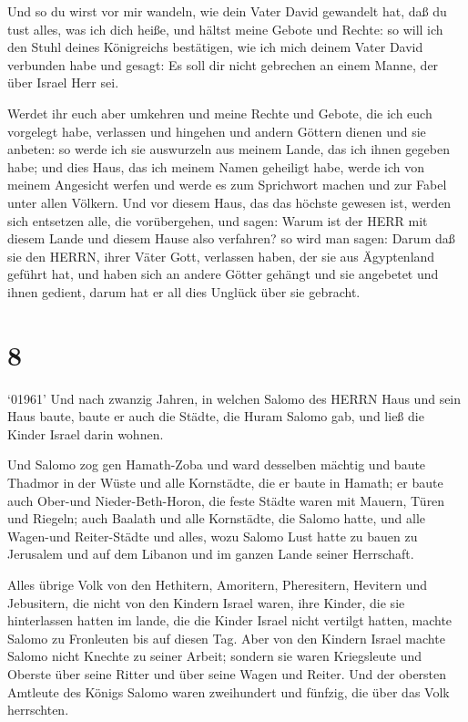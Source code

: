  Und so du wirst vor mir wandeln, wie dein Vater David
gewandelt hat, daß du tust alles, was ich dich heiße, und hältst meine
Gebote und Rechte:  so will ich den Stuhl deines
Königreichs bestätigen, wie ich mich deinem Vater David verbunden habe
und gesagt: Es soll dir nicht gebrechen an einem Manne, der über Israel
Herr sei.

 Werdet ihr euch aber umkehren und meine Rechte und Gebote,
die ich euch vorgelegt habe, verlassen und hingehen und andern Göttern
dienen und sie anbeten:  so werde ich sie auswurzeln aus
meinem Lande, das ich ihnen gegeben habe; und dies Haus, das ich meinem
Namen geheiligt habe, werde ich von meinem Angesicht werfen und werde es
zum Sprichwort machen und zur Fabel unter allen Völkern. 
Und vor diesem Haus, das das höchste gewesen ist, werden sich entsetzen
alle, die vorübergehen, und sagen: Warum ist der HERR mit diesem Lande
und diesem Hause also verfahren?  so wird man sagen: Darum
daß sie den HERRN, ihrer Väter Gott, verlassen haben, der sie aus
Ägyptenland geführt hat, und haben sich an andere Götter gehängt und sie
angebetet und ihnen gedient, darum hat er all dies Unglück über sie
gebracht.

\hypertarget{section-7}{%
\section{8}\label{section-7}}

 `01961' Und nach zwanzig Jahren, in welchen Salomo des
HERRN Haus und sein Haus baute,  baute er auch die Städte,
die Huram Salomo gab, und ließ die Kinder Israel darin wohnen.

 Und Salomo zog gen Hamath-Zoba und ward desselben mächtig
 und baute Thadmor in der Wüste und alle Kornstädte, die er
baute in Hamath;  er baute auch Ober-und Nieder-Beth-Horon,
die feste Städte waren mit Mauern, Türen und Riegeln;  auch
Baalath und alle Kornstädte, die Salomo hatte, und alle Wagen-und
Reiter-Städte und alles, wozu Salomo Lust hatte zu bauen zu Jerusalem
und auf dem Libanon und im ganzen Lande seiner Herrschaft.

 Alles übrige Volk von den Hethitern, Amoritern,
Pheresitern, Hevitern und Jebusitern, die nicht von den Kindern Israel
waren,  ihre Kinder, die sie hinterlassen hatten im lande,
die die Kinder Israel nicht vertilgt hatten, machte Salomo zu Fronleuten
bis auf diesen Tag.  Aber von den Kindern Israel machte
Salomo nicht Knechte zu seiner Arbeit; sondern sie waren Kriegsleute und
Oberste über seine Ritter und über seine Wagen und Reiter. 
Und der obersten Amtleute des Königs Salomo waren zweihundert und
fünfzig, die über das Volk herrschten.

